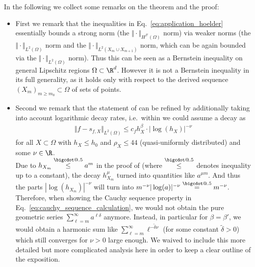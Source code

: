 \documentclass[a4paper, 10pt]{article}
\makeatletter
\newcommand*\bigcdot{\mathpalette\bigcdot@{.5}}
\newcommand*\bigcdot@[2]{\mathbin{\vcenter{\hbox{\scalebox{#2}{$\m@th#1\bullet$}}}}}
\makeatother
\begin{document}
\noindent In the following we collect some remarks on the theorem and the proof:
\begin{itemize}
%
%
%
\item First we remark that the inequalities in Eq.~\eqref{eq:application_hoelder} essentially bounds a strong norm (the $\Vert \cdot \Vert_{H^{\beta'}(\Omega)}$ norm) via weaker norms 
(the $\Vert \cdot \Vert_{L^2(\Omega)}$ norm and the $\Vert \cdot \Vert_{L^2(X_m \cup X_{m+1})}$ norm, which can be again bounded via the $\Vert \cdot \Vert_{L^2(\Omega)}$ norm).
Thus this can be seen as a Bernstein inequality on general Lipschitz regions $\Omega \subset \R^d$.
However it is not a Bernstein inequality in its full generality, 
as it holds only with respect to the derived sequence $(X_m)_{m \geq m_0} \subset \Omega$ of  sets of points.
%
%
%
%
%
%
%
%

%
%
%
%
%
%
%
%
%
%
%
%
%
%
%
%
%
%
\item Second we remark that the statement of  can be refined by additionally taking into account logarithmic decay rates, 
i.e.\ within  we could assume a decay as
\begin{align*}
\Vert f - s_{f, X} \Vert_{L^2(\Omega)} \leq c_f h_X^{\beta} \cdot |\log(h_X)|^{-\nu}
\end{align*}
for all $X \subset \Omega$ with $h_X \leq h_0$ and $\rho_X \leq 44$ (quasi-uniformly distributed) and some $\nu \in \R$. \\
%
Due to $h_{X_m} \stackrel{\bigcdot}{\leq} a^m$ in the proof of  (where $\stackrel{\bigcdot}{\leq}$ denotes inequality up to a constant), 
the decay $h_{X_m}^{\mu}$ turned into quantities like $a^{\mu m}$.
And thus the parts $|\log(h_{X_m})|^{-\nu}$ will turn into $m^{-\nu} |\log(a)|^{-\nu} \stackrel{\bigcdot}{=} m^{-\nu}$.
Therefore, when showing the Cauchy sequence property in Eq.~\eqref{eq:cauchy_sequence_calculation}, 
we would not obtain the pure geometric series $\sum_{\ell=m}^{\infty} a^{\ell\delta}$ anymore.
Instead, in particular for $\beta = \beta'$, we would obtain a harmonic sum like $\sum_{\ell=m}^{\infty} \ell^{-\tilde{\delta} \nu}$ (for some constant $\tilde{\delta} > 0$) which still converges for $\nu > 0$ large enough.
We waived to include this more detailed but more complicated analysis here in order to keep a clear outline of the exposition.
%
%
%

%
%
\end{itemize}
\end{document}
